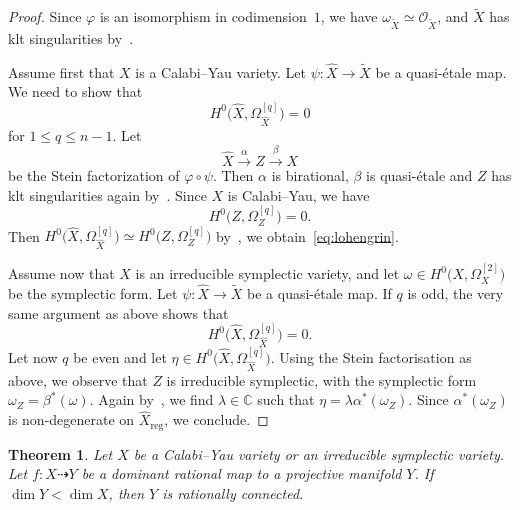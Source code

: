 \documentclass[11pt]{article}
\newtheorem{theo}{Theorem}[section]
\theoremstyle{definition}
\numberwithin{equation}{section}
\numberwithin{figure}{section}
\numberwithin{table}{section}
\DeclareMathOperator{\reg}{reg}
\newcommand{\Cbb}{\mathbb{C}}
\newcommand{\OO}{\mathcal{O}}
\begin{document}
\begin{proof}
Since $\varphi$ is an isomorphism in codimension~$1$, we have $\omega_{\widetilde X}\simeq \OO_{\widetilde X}$, and $\widetilde X$ has klt singularities by~\cite[Proposition~5.20]{KM98}.

Assume first that $X$ is a Calabi--Yau variety. Let $\psi\colon \widehat X \to \widetilde X$ be a quasi-étale map. We need to show that
\begin{equation}\label{eq:lohengrin}
H^0\big(\widehat X,\Omega^{[q]}_{\widehat X}\big) = 0
\end{equation}
for $1 \leq q \leq n-1$. Let
\[
\widehat X \overset{\alpha}{\longrightarrow} Z \overset{\beta}{\longrightarrow} X
\]
be the Stein factorization of $\varphi\circ\psi$. Then $\alpha$ is birational, $\beta $ is quasi-étale and $Z$ has klt singularities again by~\cite[Proposition~5.20]{KM98}. Since $X$ is Calabi--Yau, we have
\[
H^0\big(Z,\Omega^{[q]}_Z \big) = 0.
\]
Then $H^0\big(\widehat X,\Omega^{[q]}_{\widehat X}\big) \simeq H^0\big(Z,\Omega^{[q]}_Z\big)$ by~\cite[Theorem~1.4]{GKKP11}, we obtain~\eqref{eq:lohengrin}.

Assume now that $X$ is an irreducible symplectic variety, and let $\omega \in H^0\big(X,\Omega^{[2]}_X\big) $ be the symplectic form. Let $\psi\colon \widehat X \to \widetilde X$ be a quasi-étale map. If $q$ is odd, the very same argument as above shows that
\[
H^0\big(\widehat X,\Omega^{[q]}_{\widehat X}\big) = 0.
\]
Let now $q $ be even and let $\eta \in H^0\big(\widehat X,\Omega^{[q]}_{\widehat X}\big)$. Using the Stein factorisation as above, we observe that $Z$ is irreducible symplectic, with the symplectic form $\omega_Z = \beta^*(\omega)$. Again by~\cite[Theorem~1.4]{GKKP11}, we find $\lambda \in \Cbb$ such that $\eta = \lambda\alpha^*(\omega_Z)$. Since $\alpha^*(\omega_Z)$ is non-degenerate on $\widehat X_{\reg}$, we conclude.
\end{proof}

\begin{theo}\label{thm1-1}
Let $X$ be a Calabi--Yau variety or an irreducible symplectic variety. Let $f\colon X \dasharrow Y$ be a dominant rational map to a projective manifold $Y$. If $\dim Y < \dim X$, then $Y$ is rationally connected.
\end{theo}
\end{document}
